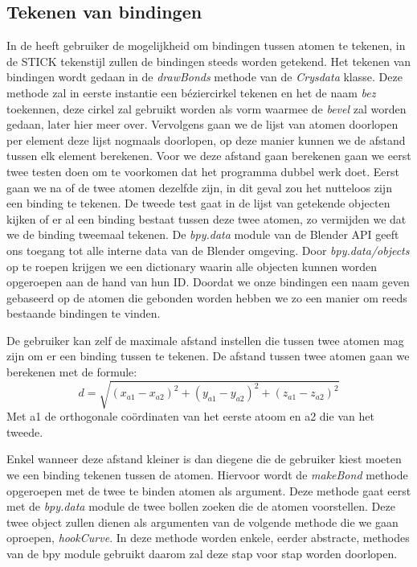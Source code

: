 \subsection{Tekenen van bindingen}    

In de heeft gebruiker de mogelijkheid om bindingen tussen atomen te tekenen, in de {STICK} tekenstijl zullen de bindingen steeds worden getekend. Het tekenen van bindingen wordt gedaan in de \textit{drawBonds} methode van de \textit{Crysdata} klasse. Deze methode zal in eerste instantie een béziercirkel tekenen en het de naam \textit{bez} toekennen, deze cirkel zal gebruikt worden als vorm waarmee de \textit{bevel} zal worden gedaan, later hier meer over. Vervolgens gaan we de lijst van atomen doorlopen per element deze lijst nogmaals doorlopen, op deze manier kunnen we de afstand tussen elk element berekenen. Voor we deze afstand gaan berekenen gaan we eerst twee testen doen om te voorkomen dat het programma dubbel werk doet. Eerst gaan we na of de twee atomen dezelfde zijn, in dit geval zou het nutteloos zijn een binding te tekenen. De tweede test gaat in de lijst van getekende objecten kijken of er al een binding bestaat tussen deze twee atomen, zo vermijden we dat we de binding tweemaal tekenen. De \textit{bpy.data} module van de Blender API geeft ons toegang tot alle interne data van de Blender omgeving. Door \textit{bpy.data/objects} op te roepen krijgen we een dictionary waarin alle objecten kunnen worden opgeroepen aan de hand van hun ID. Doordat we onze bindingen een naam geven gebaseerd op de atomen die gebonden worden hebben we zo een manier om reeds bestaande bindingen te vinden.
\par
De gebruiker kan zelf de maximale afstand instellen die tussen twee atomen mag zijn om er een binding tussen te tekenen. De afstand tussen twee atomen gaan we berekenen met de formule:
\[ d = \sqrt{(x_{a1}-x_{a2})^2+(y_{a1}-y_{a2})^2+(z_{a1}-z_{a2})^2}\]   
Met a1 de orthogonale coördinaten van het eerste atoom en a2 die van het tweede.
\par
Enkel wanneer deze afstand kleiner is dan diegene die de gebruiker kiest moeten we een binding tekenen tussen de atomen. Hiervoor wordt de \textit{makeBond} methode opgeroepen met de twee te binden atomen als argument. Deze methode gaat eerst met de \textit{bpy.data} module de twee bollen zoeken die de atomen voorstellen. Deze twee object zullen dienen als argumenten van de volgende methode die we gaan oproepen, \textit{hookCurve}. In deze methode worden enkele, eerder abstracte, methodes van de bpy module gebruikt daarom zal deze stap voor stap worden doorlopen.

